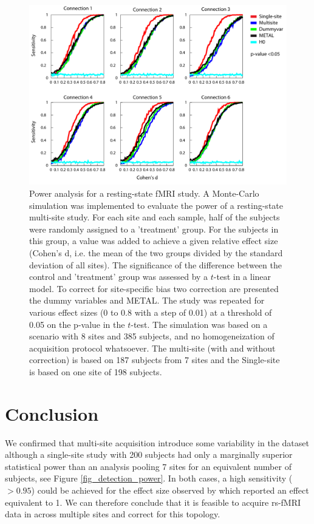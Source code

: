 \documentclass[authoryear]{elsarticle}
\begin{document}
\begin{figure}[H]
\begin{center}
\includegraphics[width=\linewidth]{../figures/multisite_simulation_50pct.pdf}
\end{center}
\caption[Detection power 2]{
Power analysis for a resting-state fMRI study. A Monte-Carlo simulation was implemented to evaluate the power of a resting-state multi-site study. For each site and each sample, half of the subjects were randomly assigned to a 'treatment' group. For the subjects in this group, a value was added to achieve a given relative effect size (Cohen's d, i.e. the mean of the two groups divided by the standard deviation of all sites). The significance of the difference between the control and 'treatment' group was assessed by a $t$-test in a linear model. To correct for site-specific bias two correction are presented the dummy variables and METAL. The study was repeated for various effect sizes (0 to 0.8 with a step of 0.01) at a threshold of 0.05 on the p-value in the $t$-test. The simulation was based on a scenario with 8 sites and 385 subjects, and no homogeneization of acquisition protocol whatsoever. The multi-site (with and without correction) is based on 187 subjects from 7 sites and the Single-site is based on 
one site of 198 subjects. 
}
\label{fig_simu_50pct}
\end{figure}


\section{Conclusion}

We confirmed that multi-site acquisition introduce some variability in the dataset although a single-site study with 200 subjects had only a marginally superior statistical power than an analysis pooling 7 sites for an equivalent number of subjects, see Figure \ref{fig_detection_power}. In both cases, a high sensitivity ($>0.95$) could be achieved for the effect size observed by \cite{Goveas2011} which reported an effect equivalent to 1. We can therefore conclude that it is feasible to acquire rs-fMRI data in across multiple sites and correct for this topology.
\end{document}
